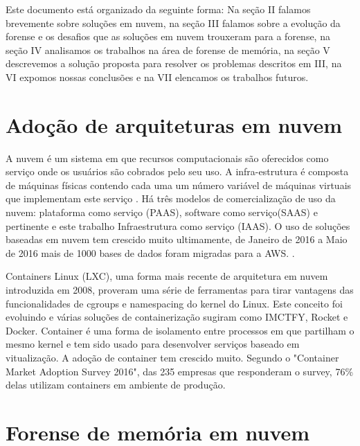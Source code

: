 \documentclass[conference]{IEEEtran}
\begin{document}
Este documento está organizado da seguinte forma: Na seção II falamos brevemente sobre soluções em nuvem, na seção III falamos sobre a evolução da forense e os desafios
que as soluções em nuvem trouxeram para a forense, na seção IV analisamos os trabalhos na área de forense de memória, na seção V descrevemos a solução proposta para 
resolver os problemas descritos em III, na VI expomos nossas conclusões e na VII elencamos os trabalhos futuros.

\section{Adoção de arquiteturas em nuvem}

A nuvem é um sistema em que recursos computacionais são oferecidos como serviço onde os usuários são cobrados pelo seu uso. A infra-estrutura é composta de máquinas físicas
contendo cada uma um número variável de máquinas virtuais que implementam este serviço \cite{Sousa2009}. Há três modelos de comercialização de uso da nuvem: plataforma como serviço (PAAS), 
software como serviço(SAAS) e pertinente e este trabalho Infraestrutura como serviço (IAAS). O uso de soluções baseadas em nuvem tem crescido muito ultimamente, de Janeiro 
de 2016 a Maio de 2016 mais de 1000 bases de dados foram migradas para a AWS. \cite{Amazon2016}.

Containers Linux (LXC), uma forma mais recente de arquitetura em nuvem introduzida em 2008, proveram uma série de ferramentas para tirar vantagens das funcionalidades 
de cgroups e namespacing do kernel do Linux. Este conceito foi evoluindo e várias soluções de containerização sugiram como IMCTFY, Rocket e Docker. Container é uma forma 
de isolamento entre processos em que partilham o mesmo kernel e tem sido usado para desenvolver serviços baseado em vitualização. A adoção de container tem 
crescido muito. Segundo o "Container Market Adoption Survey 2016", das 235 empresas que responderam o survey, 76\% delas utilizam containers em ambiente de produção.

\section{Forense de memória em nuvem}
\end{document}
